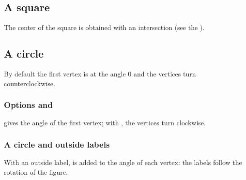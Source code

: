 \subsection{A square}
The center of the square is obtained with an intersection (see the
).

\begin{tkzexample}[latex=7cm,small]
\end{tkzexample}

\newpage
\subsection{A circle}
By default the first vertex is at the angle $0$ and the vertices turn
counterclockwise.

\begin{tkzexample}[latex=7cm,small]
\end{tkzexample}

\subsubsection{Options  and }
 gives the angle of the first vertex; with
, the vertices turn clockwise.

\begin{tkzexample}[latex=7cm,small]
\end{tkzexample}

\subsubsection{A circle and outside labels}
With an outside label,  is added to the angle of each vertex:
the labels follow the rotation of the figure.

\begin{tkzexample}[latex=7cm,small]
\end{tkzexample}

